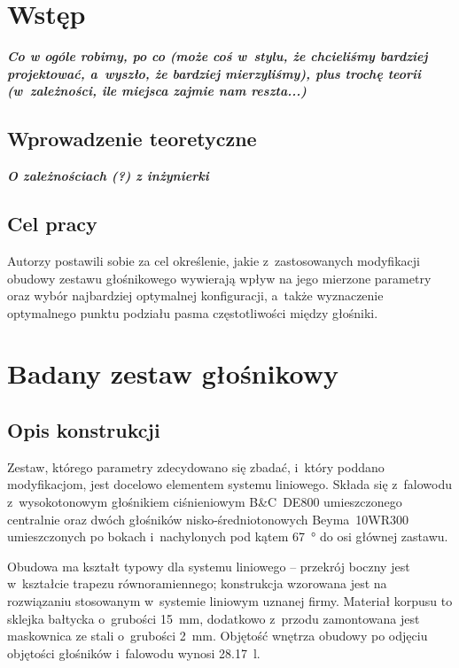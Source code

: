 \documentclass[12pt]{oska}
\affiliation{Akademia Górniczo-Hutnicza im. S. Staszica w Krakowie}
\newcommand{\comment}[1]{{\color{magenta}\emph{\textbf{#1}}}}
\begin{document}
\maketitles

\section{Wstęp}

	\comment{Co w ogóle robimy, po co (może coś w~stylu, że chcieliśmy bardziej projektować, a~wyszło, że bardziej mierzyliśmy), plus trochę teorii (w~zależności, ile miejsca zajmie nam reszta...)}
	
	\subsection{Wprowadzenie teoretyczne}
	
	\comment{O zależnościach (?) z inżynierki}
	
	\subsection{Cel pracy}
	
		Autorzy postawili sobie za cel określenie, jakie z~zastosowanych modyfikacji obudowy zestawu głośnikowego wywierają wpływ na jego mierzone parametry oraz wybór najbardziej optymalnej konfiguracji, a~także wyznaczenie optymalnego punktu podziału pasma częstotliwości między głośniki.

\section{Badany zestaw głośnikowy}

	\subsection{Opis konstrukcji}\label{ss:opis}
	
		Zestaw, którego parametry zdecydowano się zbadać, i~który poddano modyfikacjom, jest docelowo elementem systemu liniowego. Składa się z~falowodu z~wysokotonowym głośnikiem ciśnieniowym B\&C~DE800 umieszczonego centralnie oraz dwóch głośników nisko-średniotonowych Beyma~10WR300 umieszczonych po bokach i~nachylonych pod kątem \SI{67}{\degree} do osi głównej zastawu. 
		
		Obudowa ma kształt typowy dla systemu liniowego -- przekrój boczny jest w~kształcie trapezu równoramiennego; konstrukcja wzorowana jest na rozwiązaniu stosowanym w~systemie liniowym uznanej firmy. Materiał korpusu to sklejka bałtycka o~grubości \SI{15}{\milli\metre}, dodatkowo z~przodu zamontowana jest maskownica ze stali o~grubości \SI{2}{\milli\metre}. Objętość wnętrza obudowy po odjęciu objętości głośników i~falowodu wynosi \SI{28,17}{\litre}.
		
\end{document}
